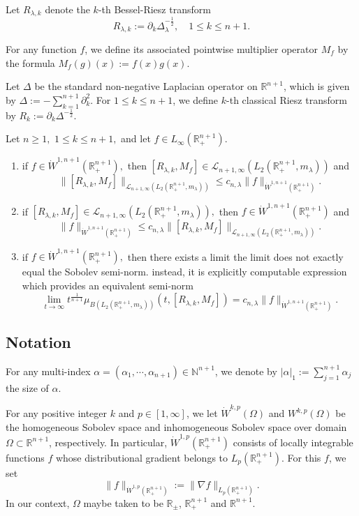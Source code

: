 \documentclass[12pt]{amsart}
\begin{document}
Let $R_{\lambda,k}$ denote the $k$-th Bessel-Riesz transform
$$ R_{\lambda,k} :=\partial_{k} \Delta_\lambda^{-\frac12},\quad 1\leq k\leq n+1.$$

For any function $f$, we define its associated pointwise multiplier operator $M_f$ by the formula $M_f(g)(x):=f(x)g(x)$.

Let $\Delta$ be the standard non-negative Laplacian operator on $\mathbb{R}^{n+1}$, which is given by $\Delta:=-\sum_{k=1}^{n+1}\partial_{k}^2$. For $1\leq k\leq n+1$, we define $k$-th classical Riesz transform by $R_k:=\partial_k\Delta^{-\frac12}$.


\begin{theorem}\label{main theorem} Let $n\geq1,$ $1\leq k\leq n+1,$ and let $f\in L_{\infty}(\mathbb{R}^{n+1}_+).$
\begin{enumerate}[{\rm (i)}]
\item\label{mta} if $f\in\dot{W}^{1,n+1}(\mathbb{R}^{n+1}_+),$ then $[R_{\lambda,k},M_f]\in \mathcal{L}_{n+1,\infty}(L_2(\mathbb{R}^{n+1}_+,m_{\lambda}))$ and
$$\|[R_{\lambda,k},M_f]\|_{\mathcal{L}_{n+1,\infty}(L_2(\mathbb{R}^{n+1}_+,m_{\lambda}))}\leq c_{n,\lambda}\|f\|_{\dot{W}^{1,n+1}(\mathbb{R}^{n+1}_+)}.$$
\item\label{mtb} if $[R_{\lambda,k},M_f]\in \mathcal{L}_{n+1,\infty}(L_2(\mathbb{R}^{n+1}_+,m_{\lambda})),$ then $f\in\dot{W}^{1,n+1}(\mathbb{R}^{n+1}_+)$ and
$$\|f\|_{\dot{W}^{1,n+1}(\mathbb{R}^{n+1}_+)}\leq c_{n,\lambda}\|[R_{\lambda,k},M_f]\|_{\mathcal{L}_{n+1,\infty}(L_2(\mathbb{R}^{n+1}_+,m_{\lambda}))}.$$
\item\label{mtc} if $f\in\dot{W}^{1,n+1}(\mathbb{R}^{n+1}_+),$ then there exists a limit {\color{red} the limit does not exactly equal the Sobolev semi-norm. instead, it is explicitly computable expression which provides an equivalent semi-norm}
$$\lim_{t\to\infty}t^{\frac1{n+1}}\mu_{B(L_2(\mathbb{R}^{n+1}_+,m_{\lambda}))}(t,[R_{\lambda,k},M_f])=c_{n,\lambda}\|f\|_{\dot{W}^{1,n+1}(\mathbb{R}^{n+1}_+)}.$$
\end{enumerate}
\end{theorem}
\subsection{Notation}
For any multi-index $\alpha=(\alpha_1,\cdots,\alpha_{n+1})\in\mathbb{N}^{n+1}$, we denote by $|\alpha|_1:=\sum_{j=1}^{n+1}\alpha_j$ the size of $\alpha$.

For any positive integer $k$ and $p\in [1,\infty]$, we let $\dot{W}^{k,p}(\Omega)$ and $W^{k,p}(\Omega)$ be the homogeneous Sobolev space and inhomogeneous Sobolev space over domain $\Omega\subset \mathbb{R}^{n+1}$, respectively. In particular, $\dot{W}^{1,p}(\mathbb{R}_+^{n+1})$ consists of locally integrable functions $f$ whose distributional gradient belongs to $L_p(\mathbb{R}_+^{n+1})$. For this $f$, we set
$$\|f\|_{\dot{W}^{1,p}(\mathbb{R}_+^{n+1})}:=\|\nabla f\|_{L_p(\mathbb{R}_+^{n+1})}.$$
In our context, $\Omega$ maybe taken to be $\mathbb{R}_\pm$, $\mathbb{R}_+^{n+1}$ and $\mathbb{R}^{n+1}$.
\end{document}
